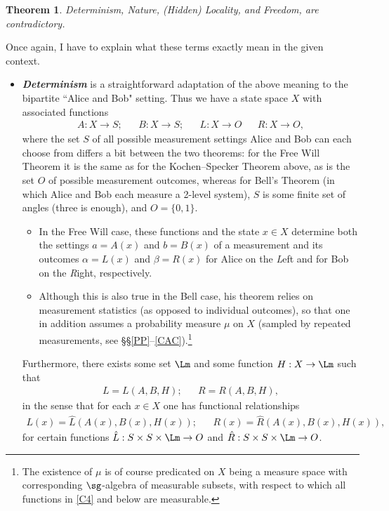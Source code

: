 \documentclass[12pt]{article}
\numberwithin{equation}{section}
\newcommand{\hi}[1]{\emph{\textbf{#1}}}
\newcommand{\er}{\eqref}
\newcommand{\raw}{\rightarrow}
\newcommand{\x}{\times}
\newcommand{\al}{\alpha} \newcommand{\bt}{L\beta}
\newtheorem{theorem}[definition]{Theorem}
\begin{document}
\begin{theorem}\label{FWTthm}
Determinism, Nature, (Hidden) Locality, and Freedom,   are contradictory.
\end{theorem}
Once again, I have to explain what these terms exactly mean in the given context. 
\begin{itemize}
\item \hi{Determinism} is a straightforward adaptation of the above meaning to the bipartite ``Alice and Bob" setting. Thus we have a state space $X$  with associated functions 
\begin{align}
A: X\raw S; & &
B: X\raw S; &&
 L:X\raw O & &
 R: X\raw O, \label{C4}
\end{align}
where the set $S$ of all possible measurement settings Alice and Bob can each choose from differs a bit between the two theorems:
for the Free Will Theorem it is the same as for the Kochen--Specker Theorem above, as is the set  $O$ of possible measurement outcomes, 
whereas for Bell's Theorem (in which Alice and Bob each measure a 2-level system), $S$ is some finite set of angles (three is enough), and 
 $O=\{0,1\}$.
 \begin{itemize}
\item In the Free Will case, these functions and the state $x\in X$ determine both the settings $a=A(x)$ and $b=B(x)$ of a measurement  and its outcomes  $\al=L(x)$ and $\beta=R(x)$ for Alice on the \emph{L}eft and for Bob on the \emph{R}ight, respectively.
\item  Although this is also true in the Bell case,  his theorem relies on measurement statistics (as opposed to individual outcomes), so that one in addition assumes a probability measure $\mu$ on $X$ (sampled by repeated measurements, see \S\S\ref{PP}--\ref{CAC}).\footnote{The existence of $\mu$ is of course predicated on $X$ being a measure space with corresponding $\sg$-algebra of measurable subsets, with respect to which all functions in \er{C4} and below are measurable.}
\end{itemize}
Furthermore, there exists some set $\Lm$ and some  function  $H:X\raw \Lm$ such that
 \begin{align}
 L=L(A,B,H); &&
 R=R(A,B,H),
\end{align}
 in the sense that for each $x\in X$ one has  functional relationships
 \begin{align}
 L(x)=\hat{L}(A(x),B(x),H(x)); &&
 R(x)=\hat{R}(A(x),B(x),H(x)),\label{GhatG}
\end{align}
  for certain functions
  $\hat{L}:S \x S\x \Lm\raw O$ and  $\hat{R}:S \x S\x \Lm\raw O$. 

\end{itemize}
\end{document}
